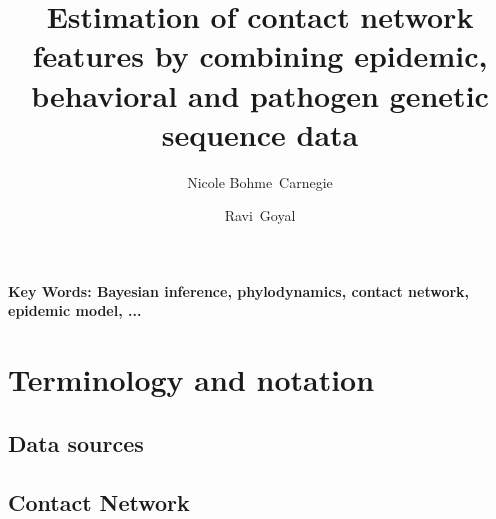 \documentclass[11pt, notitlepage]{article}%
\numberwithin{equation}{section}
\begin{document}
\title{Estimation of contact network features by combining epidemic, behavioral and pathogen genetic sequence data}
\author[1]{Nicole Bohme~Carnegie}
\author[2]{Ravi~Goyal}

\maketitle

\begin{abstract}

\end{abstract}
\doublespacing
\textbf{Key Words: Bayesian inference, phylodynamics, contact network, epidemic model, ...} 

\section{Terminology and notation}

\subsection{Data sources}

\subsection{Contact Network}
 
\end{document}
